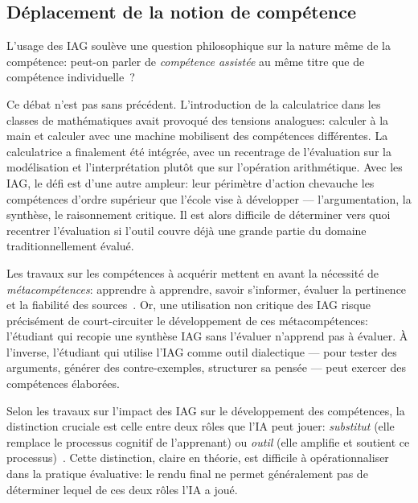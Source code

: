 \subsection{D\'eplacement de la notion de comp\'etence}

L'usage des IAG soul\`eve une question philosophique sur la nature m\^eme de la comp\'etence: peut-on parler de \emph{comp\'etence assist\'ee} au m\^eme titre que de comp\'etence individuelle~?

Ce d\'ebat n'est pas sans pr\'ec\'edent. 
L'introduction de la calculatrice dans les classes de math\'ematiques avait provoqu\'e des tensions analogues: calculer \`a la main et calculer avec une machine mobilisent des comp\'etences diff\'erentes. 
La calculatrice a finalement \'et\'e int\'egr\'ee, avec un recentrage de l'\'evaluation sur la mod\'elisation et l'interpr\'etation plut\^ot que sur l'op\'eration arithm\'etique. 
Avec les IAG, le d\'efi est d'une autre ampleur: leur p\'erim\`etre d'action chevauche les comp\'etences d'ordre sup\'erieur que l'\'ecole vise \`a d\'evelopper --- l'argumentation, la synth\`ese, le raisonnement critique.
Il est alors difficile de déterminer vers quoi recentrer l'\'evaluation si l'outil couvre déjà une grande partie du domaine traditionnellement évalué.

Les travaux sur les comp\'etences \`a acqu\'erir mettent en avant la n\'ecessit\'e de \emph{m\'etacomp\'etences}: apprendre \`a apprendre, savoir s'informer, \'evaluer la pertinence et la fiabilit\'e des sources~\citep{heiser2023education}. 
Or, une utilisation non critique des IAG risque pr\'ecis\'ement de court-circuiter le d\'eveloppement de ces m\'etacomp\'etences: l'\'etudiant qui recopie une synth\`ese IAG sans l'\'evaluer n'apprend pas \`a \'evaluer. 
\`A l'inverse, l'\'etudiant qui utilise l'IAG comme outil dialectique --- pour tester des arguments, g\'en\'erer des contre-exemples, structurer sa pens\'ee --- peut exercer des comp\'etences \'elabor\'ees.

Selon les travaux sur l'impact des IAG sur le d\'eveloppement des comp\'etences, la distinction cruciale est celle entre deux r\^oles que l'IA peut jouer: \emph{substitut} (elle remplace le processus cognitif de l'apprenant) ou \emph{outil} (elle amplifie et soutient ce processus)~\citep{shiohira2021comprendre}. 
Cette distinction, claire en th\'eorie, est difficile \`a op\'erationnaliser dans la pratique \'evaluative: le rendu final ne permet g\'en\'eralement pas de d\'eterminer lequel de ces deux r\^oles l'IA a jou\'e.
